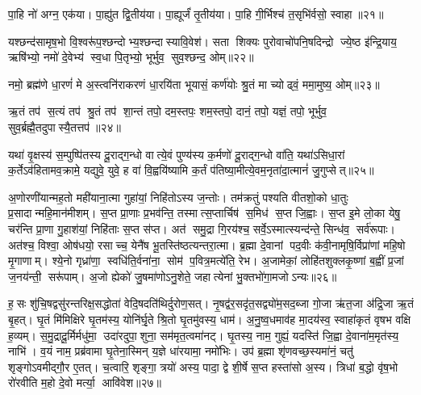 पा॒हि नो॑ अग्न॒ एक॑या। पा॒ह्यु॑त द्वि॒तीय॑या। पा॒ह्यूर्जं॑ तृ॒तीय॑या। पा॒हि गी॒र्भिश्च॑ त॒सृभि॑र्वसो॒ स्वाहा॥२१॥
\anuvakamend

यश्छन्द॑सामृष॒भो वि॒श्वरू॑प॒श्छन्दोभ्य॒श्छन्दास्यावि॒वेश॑। सता शिक्यः पुरोवाचो॑पनि॒षदिन्द्रो ज्ये॒ष्ठ इ॑न्द्रि॒याय॒ ऋषि॑भ्यो॒ नमो॑ दे॒वेभ्य॑ स्व॒धा पि॒तृभ्यो॒ भूर्भुव॒ सुव॒श्छन्द॒ ओम्॥२२॥
\anuvakamend


नमो॒ ब्रह्म॑णे धा॒रणं॑ मे अ॒स्त्वनि॑राकरणं धा॒रयि॑ता भूयासं॒ कर्ण॑योः श्रु॒तं मा च्योढ्वं॒ ममा॒मुष्य॒ ओम्॥२३॥
\anuvakamend

ऋ॒तं तप॑ स॒त्यं तप॑ श्रु॒तं तप॑ शा॒न्तं तपो॒ दम॒स्तपः॒ शम॒स्तपो॒ दानं॒ तपो॒ यज्ञं॒ तपो॒ भूर्भुव॒ सुव॒र्ब्रह्मै॒तदुपास्यै॒तत्तप॑॥२४॥
\anuvakamend


यथा॑ वृ॒क्षस्य॑ स॒म्पुष्पि॑तस्य दू॒राद्ग॒न्धो वात्ये॒वं पुण्य॑स्य क॒र्मणो॑ दू॒राद्ग॒न्धो वा॑ति॒ यथा॑ऽसिधा॒रां क॒र्तेऽव॑हितामव॒क्रामे॒ यद्युवे॒ युवे॒ ह वा॑ वि॒ह्वयि॑ष्यामि क॒र्तं प॑तिष्या॒मीत्ये॒वम॒नृता॑दा॒त्मानं॑ जु॒गुप्सेत्॥२५॥
\anuvakamend


अ॒णोरणी॑यान्मह॒तो मही॑याना॒त्मा गुहा॑यां॒ निहि॑तोऽस्य ज॒न्तोः। तम॑क्रतुं पश्यति वीतशो॒को धा॒तुः प्र॒सादान्महि॒मान॑\-मीशम्। स॒प्त प्रा॒णाः प्र॒भव॑न्ति॒ तस्मात्स॒प्तार्चिष॑ स॒मिध॑ स॒प्त जि॒ह्वाः। स॒प्त इ॒मे लो॒का येषु॒ चर॑न्ति प्रा॒णा गु॒हाश॑यां॒ निहि॑ताः स॒प्त स॑प्त। अत॑ समु॒द्रा गि॒रय॑श्च॒ सर्वे॒ऽस्मात्स्यन्द॑न्ते॒ सिन्ध॑व॒ सर्व॑रूपाः। अत॑श्च॒ विश्वा॒ ओष॑धयो॒ रसाच्च॒ येनै॑ष भू॒तस्ति॑ष्ठत्यन्तरा॒त्मा। ब्र॒ह्मा दे॒वानां पद॒वीः क॑वी॒नामृषि॒र्विप्रा॑णां महि॒षो मृ॒गाणाम्। श्ये॒नो गृध्रा॑णा॒ स्वधि॑ति॒र्वना॑ना॒ सोम॑ प॒वित्र॒मत्ये॑ति॒ रेभ\sn{}। अ॒जामेकां॒ लोहि॑तशुक्लकृ॒ष्णां ब॒ह्वीं प्र॒जां ज॒नय॑न्ती॒ सरू॑पाम्। अ॒जो ह्येको॑ जु॒षमा॑णोऽनु॒शेते॒ जहात्येनां भु॒क्तभो॑गा॒मजोऽन्यः॥२६॥

ह॒सः शु॑चि॒षद्वसु॑रन्तरिक्ष॒सद्धोता॑ वेदि॒षदति॑थिर्दुरोण॒सत्। नृ॒षद्व॑र॒सदृ॑त॒सद्व्यो॑म॒सद॒ब्जा गो॒जा ऋ॑त॒जा अ॑द्रि॒जा ऋ॒तं बृ॒हत्। घृ॒तं मि॑मिक्षिरे घृ॒तम॑स्य॒ योनि॑र्घृ॒ते श्रि॒तो घृ॒तमु॑वस्य॒ धाम॑। अ॒नु॒ष्व॒धमाव॑ह मा॒दय॑स्व॒ स्वाहा॑कृतं वृषभ वक्षि ह॒व्यम्। स॒मु॒द्रादू॒र्मिर्मधु॑मा॒ उदा॑रदुपा॒शुना॒ सम॑मृत॒त्वमा॑नट्। घृ॒तस्य॒ नाम॒ गुह्यं॒ यदस्ति॑ जि॒ह्वा दे॒वाना॑म॒मृत॑स्य॒ नाभि॑। व॒यं नाम॒ प्रब्र॑वामा घृ॒तेना॒स्मिन् य॒ज्ञे धा॑रयामा॒ नमो॑भिः। उप॑ ब्र॒ह्मा शृ॑णवच्छ॒स्यमा॑नं॒ चतु॑ शृङ्गोऽवमीद्गौ॒र ए॒तत्। च॒त्वारि॒ शृङ्गा॒ त्रयो॑ अस्य॒ पादा॒ द्वे शी॒र्\mbox{}षे स॒प्त हस्ता॑सो अ॒स्य। त्रिधा॑ ब॒द्धो वृ॑ष॒भो रो॑रवीति म॒हो दे॒वो मर्त्या॒ आवि॑वेश॥२७॥

